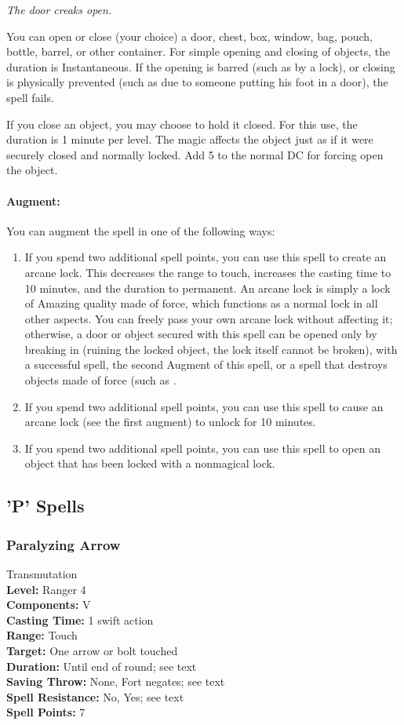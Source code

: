 \emph{The door creaks open.}

You can open or close (your choice) a door, chest, box, window, bag, pouch, bottle, barrel, or other container.
For simple opening and closing of objects, the duration is Instantaneous.
If the opening is barred (such as by a lock), or closing is physically prevented (such as due to someone putting his foot in a door), the spell fails.

If you close an object, you may choose to hold it closed. 
For this use, the duration is 1 minute per level. 
The magic affects the object just as if it were securely closed and normally locked.
Add 5 to the normal DC for forcing open the object.

\paragraph{Augment:} You can augment the spell in one of the following ways:
\begin{enumerate}
\item If you spend two additional spell points, you can use this spell to create an arcane lock. This decreases the range to touch, increases the casting time to 10 minutes, and the duration to permanent. 
An arcane lock is simply a lock of Amazing quality made of force, which functions as a normal lock in all other aspects.
You can freely pass your own arcane lock without affecting it; 
otherwise, a door or object secured with this spell can be opened only by breaking in (ruining the locked object, the lock itself cannot be broken), with a successful  spell, the second Augment of this spell, or a spell that destroys objects made of force (such as .
\item If you spend two additional spell points, you can use this spell to cause an arcane lock (see the first augment) to unlock for 10 minutes.
\item If you spend two additional spell points, you can use this spell to open an object that has been locked with a nonmagical lock.
\end{enumerate}
\subsection{'P' Spells}
\subsubsection{Paralyzing Arrow}
\label{Spell:ParalyzingArrow}
Transmutation
\\ \textbf{Level:} Ranger 4
\\ \textbf{Components:} V
\\ \textbf{Casting Time:} 1 swift action
\\ \textbf{Range:} Touch
\\ \textbf{Target:} One arrow or bolt touched
\\ \textbf{Duration:} Until end of round; see text
\\ \textbf{Saving Throw:} None, Fort negates; see text
\\ \textbf{Spell Resistance:} No, Yes; see text
\\ \textbf{Spell Points:} 7

